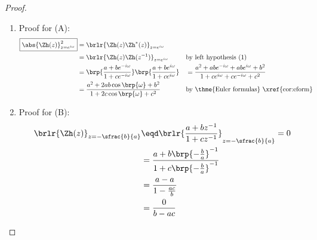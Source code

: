 \begin{proof}
\begin{enumerate}
\item Proof for (A):
  \begin{align*}
    \boxed{\abs{\Zh(z)}^2_{z=e^{i\omega}}}
      &= \brlr{\Zh(z)\Zh^\ast(z)}_{z=e^{i\omega}}
    \\&= \brlr{\Zh(z)\Zh(z^{-1})}_{z=e^{i\omega}}
     &&  \text{by left hypothesis (1)}
    \\&= \brp{\frac{a + be^{-i\omega}}{1 + ce^{-i\omega}}}
         \brp{\frac{a + be^{i\omega}}{1 + ce^{i\omega}}}
     &&= \frac{a^2 + abe^{-i\omega} + abe^{i\omega} + b^2}
              {1   +  ce^{i\omega} +  ce^{-i\omega} + c^2}
    \\&= \frac{a^2 + 2ab\cos\brp{\omega} + b^2}
              {1   + 2 c\cos\brp{\omega} + c^2}
      && \text{by \thme{Euler formulas} \xref{cor:eform}}
  \end{align*}

  \item Proof for (B): 
    \begin{align*}
      \brlr{\Zh(z)}_{z=-\sfrac{b}{a}}
        &\eqd \brlr{\frac{a + bz^{-1}}{1 + cz^{-1}}}_{z=-\sfrac{b}{a}}=0
      \\&=    \frac{a + b\brp{-\frac{b}{a}}^{-1}}
                   {1 + c\brp{-\frac{b}{a}}^{-1}}
      \\&=    \frac{a - a}
                   {1 - \frac{ac}{b}}
      \\&=    \frac{0}{b - ac}
    \end{align*}
\end{enumerate}
\end{proof}

